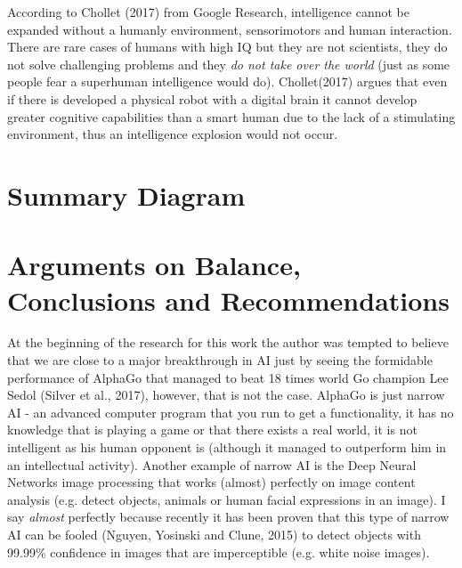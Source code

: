 \documentclass[11pt]{article}
\begin{document}
\indent
	According to Chollet (2017) from Google Research, intelligence cannot be expanded without a humanly environment, sensorimotors and human interaction. There are rare cases of humans with high IQ but they are not scientists, they do not solve challenging problems and they \textit{do not take over the world} (just as some people fear a superhuman intelligence would do).  Chollet(2017) argues that even if there is developed a physical robot with a digital brain it cannot develop greater cognitive capabilities than a smart human due to the lack of a stimulating environment, thus an intelligence explosion would not occur. 
\newpage
\section*{Summary Diagram}

\newpage	
\section*{Arguments on Balance, Conclusions and Recommendations}
	At the beginning of the research for this work the author was tempted to believe that we are close to a major breakthrough in AI just by seeing the formidable performance of AlphaGo that managed to beat 18 times world Go champion Lee Sedol (Silver et al., 2017), however, that is not the case. AlphaGo is just narrow AI - an advanced computer program that you run to get a functionality, it has no knowledge that is playing a game or that there exists a real world, it is not intelligent as his human opponent is (although it managed to outperform him in an intellectual activity). Another example of narrow AI is the Deep Neural Networks image processing that works (almost) perfectly on image content analysis (e.g. detect objects, animals or human facial expressions in an image). I say \textit{almost}  perfectly because recently it has been proven that this type of narrow AI can be fooled (Nguyen, Yosinski and Clune, 2015) to detect objects with 99.99\% confidence in images that are imperceptible (e.g. white noise images). \\ 
\end{document}
